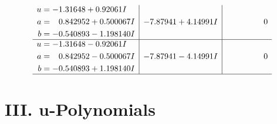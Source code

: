 \documentclass[1p]{elsarticle_modified}
\theoremstyle{definition}
\begin{document}
$$\begin{array}{c|c|c}
\begin{aligned}
u &= -1.31648 + 0.92061 I \\
a &= \phantom{-}0.842952 + 0.500067 I \\
b &= -0.540893 - 1.198140 I\end{aligned}
 & -7.87941 + 4.14991 I & \phantom{-0.000000 } 0 \\ \hline\begin{aligned}
u &= -1.31648 - 0.92061 I \\
a &= \phantom{-}0.842952 - 0.500067 I \\
b &= -0.540893 + 1.198140 I\end{aligned}
 & -7.87941 - 4.14991 I & \phantom{-0.000000 } 0\\
 \hline 
 \end{array}$$\newpage
\newpage\renewcommand{\arraystretch}{1}
\centering \section*{ III. u-Polynomials}
\end{document}
